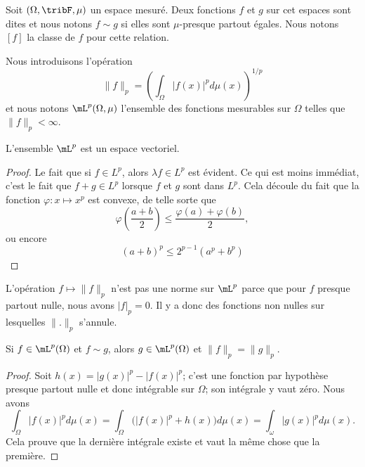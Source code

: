 Soit \( (\Omega,\tribF,\mu)\) un espace mesuré. Deux fonctions \( f\) et \( g\) sur cet espaces sont dites  et nous notons \( f\sim g\) si elles sont \( \mu\)-presque partout égales. Nous notons \( [f]\) la classe de \( f\) pour cette relation.

Nous introduisons l'opération
\begin{equation}
    \| f \|_p=\left( \int_{\Omega}| f(x) |^pd\mu(x) \right)^{1/p}
\end{equation}
et nous notons \( \mL^p(\Omega,\mu)\) l'ensemble des fonctions mesurables sur \( \Omega\) telles que \( \| f \|_p<\infty\).

\begin{lemma}
    L'ensemble \( \mL^p\) est un espace vectoriel.
\end{lemma}
    
\begin{proof}
    Le fait que si \( f\in L^p\), alors \( \lambda f\in L^p\) est évident. Ce qui est moins immédiat, c'est le fait que \( f+g\in L^p\) lorsque \( f\) et \( g\) sont dans \( L^p\). Cela découle du fait que la fonction \( \varphi\colon x\mapsto x^p\) est convexe, de telle sorte que
    \begin{equation}
        \varphi\left( \frac{ a+b }{2} \right)\leq\frac{ \varphi(a)+\varphi(b) }{2},
    \end{equation}
    ou encore
    \begin{equation}    \label{EqZFSduFa}
        (a+b)^p\leq 2^{p-1}(a^p+b^p)
    \end{equation}
\end{proof}

    L'opération \( f\mapsto \| f \|_p\) n'est pas une norme sur \( \mL^p\) parce que pour \( f\) presque partout nulle, nous avons \( | f |_p=0\). Il y a donc des fonctions non nulles sur lesquelles \( \| . \|_p\) s'annule.

\begin{lemma}       \label{LemKZVHVAR}
    Si \( f\in \mL^p(\Omega)\) et \( f\sim g\), alors \( g\in \mL^p(\Omega)\) et \( \| f \|_p=\| g \|_p\).
\end{lemma}

\begin{proof}
    Soit \( h(x)=| g(x) |^p-| f(x) |^p\); c'est une fonction par hypothèse presque partout nulle et donc intégrable sur \( \Omega\); son intégrale y vaut zéro. Nous avons
    \begin{equation}
        \int_{\Omega}| f(x) |^pd\mu(x)=\int_{\Omega}\Big( | f(x) |^p+h(x)\big)d\mu(x)=\int_{\omega}| g(x) |^pd\mu(x).
    \end{equation}
    Cela prouve que la dernière intégrale existe et vaut la même chose que la première.
\end{proof}

